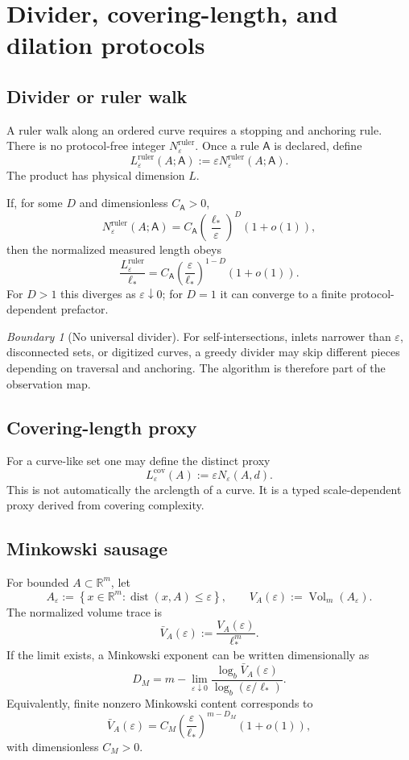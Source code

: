 \documentclass[11pt,a4paper]{article}
\theoremstyle{definition}
\theoremstyle{plain}
\theoremstyle{remark}
\newtheorem{warning}[definition]{Boundary}
\newcommand{\R}{\mathbb{R}}
\newcommand{\Vol}{\operatorname{Vol}}
\newcommand{\dist}{\operatorname{dist}}
\newcommand{\set}[1]{\left\{#1\right\}}
\begin{document}
\section{Divider, covering-length, and dilation protocols}

\subsection{Divider or ruler walk}

A ruler walk along an ordered curve requires a stopping and anchoring
rule. There is no protocol-free integer $N_\varepsilon^{\mathrm{ruler}}$.
Once a rule $\mathsf A$ is declared, define
\[
L_{\varepsilon}^{\mathrm{ruler}}
(A;\mathsf A)
:=
\varepsilon
N_{\varepsilon}^{\mathrm{ruler}}(A;\mathsf A).
\]
The product has physical dimension $L$.

If, for some $D$ and dimensionless $C_{\mathsf A}>0$,
\[
N_{\varepsilon}^{\mathrm{ruler}}(A;\mathsf A)
=
C_{\mathsf A}
\left(\frac{\ell_*}{\varepsilon}\right)^D
(1+o(1)),
\]
then the normalized measured length obeys
\[
\frac{L_{\varepsilon}^{\mathrm{ruler}}}{\ell_*}
=
C_{\mathsf A}
\left(\frac{\varepsilon}{\ell_*}\right)^{1-D}
(1+o(1)).
\]
For $D>1$ this diverges as $\varepsilon\downarrow0$; for $D=1$ it can
converge to a finite protocol-dependent prefactor.

\begin{warning}[No universal divider]
For self-intersections, inlets narrower than $\varepsilon$, disconnected
sets, or digitized curves, a greedy divider may skip different pieces
depending on traversal and anchoring. The algorithm is therefore part of
the observation map.
\end{warning}

\subsection{Covering-length proxy}

For a curve-like set one may define the distinct proxy
\[
L_\varepsilon^{\mathrm{cov}}(A)
:=
\varepsilon N_\varepsilon(A,d).
\]
This is not automatically the arclength of a curve. It is a typed
scale-dependent proxy derived from covering complexity.

\subsection{Minkowski sausage}

For bounded $A\subset\R^m$, let
\[
A_\varepsilon
:=
\set{x\in\R^m:\dist(x,A)\leq\varepsilon},
\qquad
V_A(\varepsilon):=\Vol_m(A_\varepsilon).
\]
The normalized volume trace is
\[
\bar V_A(\varepsilon)
:=
\frac{V_A(\varepsilon)}{\ell_*^m}.
\]
If the limit exists, a Minkowski exponent can be written dimensionally as
\[
D_M
=
m-
\lim_{\varepsilon\downarrow0}
\frac{\log_b\bar V_A(\varepsilon)}
     {\log_b(\varepsilon/\ell_*)}.
\]
Equivalently, finite nonzero Minkowski content corresponds to
\[
\bar V_A(\varepsilon)
=
C_M
\left(\frac{\varepsilon}{\ell_*}\right)^{m-D_M}
(1+o(1)),
\]
with dimensionless $C_M>0$.
\end{document}
